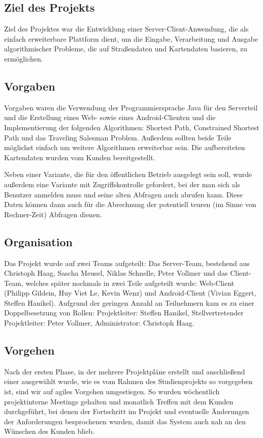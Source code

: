 \subsection*{Ziel des Projekts}

Ziel des Projektes war die Entwicklung einer Server-Client-Anwendung, die als einfach erweiterbare Plattform dient, um die Eingabe, Verarbeitung und Ausgabe algorithmischer Probleme, die auf Straßendaten und Kartendaten basieren, zu ermöglichen.

\subsection*{Vorgaben}

Vorgaben waren die Verwendung der Programmiersprache Java für den Serverteil und die Erstellung eines Web- sowie eines Android-Clienten und die Implementierung der folgenden Algorithmen: Shortest Path, Constrained Shortest Path und das Traveling Salesman Problem. Außerdem sollten beide Teile möglichst einfach um weitere Algorithmen erweiterbar sein. Die aufbereiteten Kartendaten wurden vom Kunden bereitgestellt.

Neben einer Variante, die für den öffentlichen Betrieb ausgelegt sein soll, wurde außerdem eine Variante mit Zugriffskontrolle gefordert, bei der man sich als Benutzer anmelden muss und seine alten Abfragen auch abrufen kann. Diese Daten können dann auch für die Abrechnung der potentiell teuren (im Sinne von Rechner-Zeit) Abfragen dienen.

\subsection*{Organisation}

Das Projekt wurde auf zwei Teams aufgeteilt: Das Server-Team, bestehend aus Christoph Haag, Sascha Meusel, Niklas Schnelle, Peter Vollmer und das Client-Team, welches später nochmals in zwei Teile aufgeteilt wurde: Web-Client (Philipp Gildein, Huy Viet Le, Kevin Wenz) und Android-Client (Vivian Eggert, Steffen Hanikel). Aufgrund der geringen Anzahl an Teilnehmern kam es zu einer Doppelbesetzung von Rollen: Projektleiter: Steffen Hanikel, Stellvertretender Projektleiter: Peter Vollmer, Administrator: Christoph Haag.

\subsection*{Vorgehen}

Nach der ersten Phase, in der mehrere Projektpläne erstellt und anschließend einer ausgewählt wurde, wie es vom Rahmen des Studienprojekts so vorgegeben ist, sind wir auf agiles Vorgehen umgestiegen. So wurden wöchentlich projektinterne Meetings gehalten und monatlich Treffen mit dem Kunden durchgeführt, bei denen der Fortschritt im Projekt und eventuelle Änderungen der Anforderungen besprochenen wurden, damit das System auch nah an den Wünschen des Kunden blieb.

